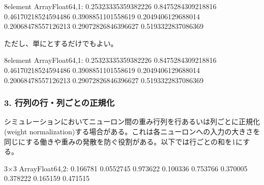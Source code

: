 \documentclass[letterpaper,10pt,english]{sphinxmanual}
\begin{document}
\begin{sphinxVerbatim}[commandchars=\\\{\}]
8\PYGZhy{}element Array\PYGZob{}Float64,1\PYGZcb{}:
 0.25323335359382226
 0.8475284309218816
 0.46170218524594486
 0.3908851101558619
 0.2049406129688014
 0.20068478557126213
 0.29072826846396627
 0.5193322837086369
\end{sphinxVerbatim}

ただし、単にとするだけでもよい。

\begin{sphinxVerbatim}[commandchars=\\\{\}]
\PYG{p}{[}\PYG{p}{]}
\end{sphinxVerbatim}

\begin{sphinxVerbatim}[commandchars=\\\{\}]
8\PYGZhy{}element Array\PYGZob{}Float64,1\PYGZcb{}:
 0.25323335359382226
 0.8475284309218816
 0.46170218524594486
 0.3908851101558619
 0.2049406129688014
 0.20068478557126213
 0.29072826846396627
 0.5193322837086369
\end{sphinxVerbatim}


\subsubsection{3. 行列の行・列ごとの正規化}
\label{\detokenize{tips:id3}}
シミュレーションにおいてニューロン間の重み行列を行あるいは列ごとに正規化 (weight normalization)する場合がある。これは各ニューロンへの入力の大きさを同じにする働きや重みの発散を防ぐ役割がある。以下では行ごとの和を1にする。

\begin{sphinxVerbatim}[commandchars=\\\{\}]
  
\end{sphinxVerbatim}

\begin{sphinxVerbatim}[commandchars=\\\{\}]
3×3 Array\PYGZob{}Float64,2\PYGZcb{}:
 0.166781  0.0552745  0.973622
 0.100336  0.753766   0.370005
 0.378222  0.165159   0.471515
\end{sphinxVerbatim}

\begin{sphinxVerbatim}[commandchars=\\\{\}]
     
\end{sphinxVerbatim}
\end{document}
